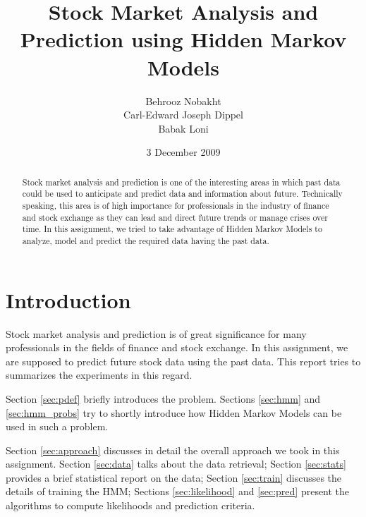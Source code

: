 \documentclass{acm_proc_article-sp}
\begin{document}
\title{Stock Market Analysis and Prediction using Hidden Markov Models}

\author{
  \alignauthor Behrooz Nobakht \\ 
  \alignauthor Carl-Edward Joseph Dippel\\ 
  \alignauthor Babak Loni\\ 
}

\date{3 December 2009}

\maketitle

\begin{abstract}
Stock market analysis and prediction is one of the interesting areas in which past data could be used to anticipate and
predict data and information about future. Technically speaking, this area is of high importance for professionals in
the industry of finance and stock exchange as they can lead and direct future trends or manage crises over time. In
this assignment, we tried to take advantage of Hidden Markov Models to analyze, model and predict the required data
having the past data.
\end{abstract}


\section{Introduction}
Stock market analysis and prediction is of great significance for many professionals in the fields of finance and stock
exchange. In this assignment, we are supposed to predict future stock data using the past data. This report tries to
summarizes the experiments in this regard.

Section \ref{sec:pdef} briefly introduces the problem. Sections \ref{sec:hmm} and \ref{sec:hmm_probs} try to shortly
introduce how Hidden Markov Models can be used in such a problem.

Section \ref{sec:approach} discusses in detail the overall approach we took in this assignment. Section \ref{sec:data}
talks about the data retrieval; Section \ref{sec:stats} provides a brief statistical report on the data; Section
\ref{sec:train} discusses the details of training the HMM; Sections \ref{sec:likelihood} and \ref{sec:pred} present
the algorithms to compute likelihoods and prediction criteria. 
\end{document}
